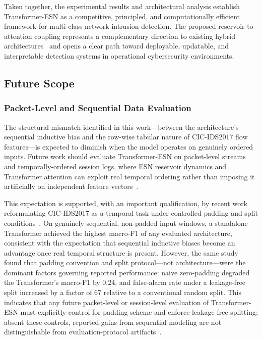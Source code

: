 \documentclass[5p,times]{elsarticle}
\begin{document}
	Taken together, the experimental results and architectural
	analysis establish Transformer-ESN as a competitive, principled,
	and computationally efficient framework for multi-class network
	intrusion detection. The proposed reservoir-to-attention coupling
	represents a complementary direction to existing hybrid
	architectures~\cite{cnnlstm2024,cnnbigru2022,bilstm_attn2023}
	and opens a clear path toward deployable, updatable, and
	interpretable detection systems in operational cybersecurity
	environments.
	
	\subsection{Future Scope}
	
	\subsubsection{Packet-Level and Sequential Data Evaluation}
	
	The structural mismatch identified in this work---between the
	architecture's sequential inductive bias and the row-wise
	tabular nature of CIC-IDS2017 flow features---is expected to
	diminish when the model operates on genuinely ordered inputs.
	Future work should evaluate Transformer-ESN on packet-level
	streams and temporally-ordered session logs, where ESN reservoir
	dynamics and Transformer attention can exploit real temporal
	ordering rather than imposing it artificially on independent
	feature vectors~\cite{grurnn2018,yin2017deep}.
	
	This expectation is supported, with an important qualification,
	by recent work reformulating CIC-IDS2017 as a temporal task under
	controlled padding and split conditions~\cite{moczkodan2026transformers}.
	On genuinely sequential, non-padded input windows, a standalone
	Transformer achieved the highest macro-F1 of any evaluated
	architecture, consistent with the expectation that sequential
	inductive biases become an advantage once real temporal structure
	is present. However, the same study found that padding convention
	and split protocol---not architecture---were the dominant factors
	governing reported performance: naive zero-padding degraded the
	Transformer's macro-F1 by 0.24, and false-alarm rate under a
	leakage-free split increased by a factor of 67 relative to a
	conventional random split. This indicates that any future
	packet-level or session-level evaluation of Transformer-ESN must
	explicitly control for padding scheme and enforce leakage-free
	splitting; absent these controls, reported gains from sequential
	modeling are not distinguishable from evaluation-protocol
	artifacts~\cite{moczkodan2026transformers}.
	
\end{document}
